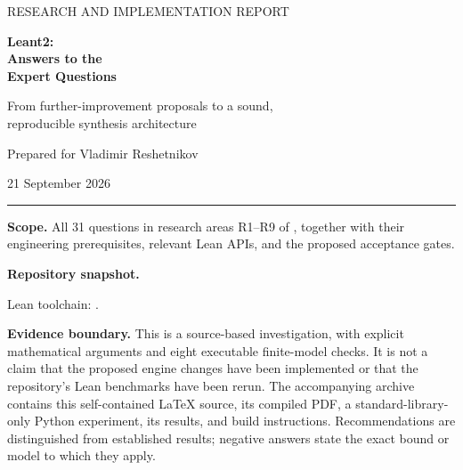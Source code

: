 \documentclass[11pt,a4paper]{article}
\newcommand{\code}[1]{\texttt{\detokenize{#1}}}
\theoremstyle{definition}
\theoremstyle{remark}
\begin{document}
\begin{titlepage}
\thispagestyle{empty}
{\sffamily\color{ink}\large RESEARCH AND IMPLEMENTATION REPORT\par}
\vspace{18mm}
{\Huge\bfseries\color{ink} Leant2:\\[2mm] Answers to the\\[2mm] Expert Questions\par}
\vspace{8mm}
{\Large From further-improvement proposals to a sound,\\reproducible synthesis architecture\par}
\vspace{12mm}
{\large Prepared for Vladimir Reshetnikov\par}
{\large 21 September 2026\par}
\vspace{12mm}
\noindent\rule{\textwidth}{.6pt}
\vspace{3mm}
\noindent\textbf{Scope.} All 31 questions in research areas R1--R9 of
, together with their engineering
prerequisites, relevant Lean APIs, and the proposed acceptance gates.
\par\vspace{4mm}
\noindent\textbf{Repository snapshot.}\par
\noindent\small{}\par
\noindent Lean toolchain: \code{leanprover/lean4:v4.34.0}.
\par\vspace{4mm}
\noindent\normalsize\textbf{Evidence boundary.} This is a source-based investigation,
with explicit mathematical arguments and eight executable finite-model checks.
It is not a claim that the proposed engine changes have been implemented or
that the repository's Lean benchmarks have been rerun.
\vfill
\noindent\small The accompanying archive contains this self-contained \LaTeX{}
source, its compiled PDF, a standard-library-only Python experiment, its results,
and build instructions. Recommendations are distinguished from established
results; negative answers state the exact bound or model to which they apply.
\end{titlepage}
\end{document}

